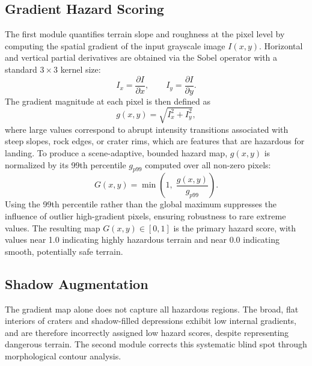 \documentclass{article}
\begin{document}
\subsection{Gradient Hazard Scoring}
The first module quantifies terrain slope and roughness at the pixel level by computing the spatial gradient of the input grayscale image $I(x,y)$. Horizontal and vertical partial derivatives are obtained via the Sobel operator\cite{sobel1968} with a standard $3 \times 3$ kernel size:
\begin{equation}
    I_x = \frac{\partial I}{\partial x}, \qquad I_y = \frac{\partial I}{\partial y}.
\end{equation}
The gradient magnitude at each pixel is then defined as
\begin{equation}
    g(x,y) = \sqrt{I_x^2 + I_y^2},
\end{equation}
where large values correspond to abrupt intensity transitions associated with steep slopes, rock edges, or crater rims, which are features that are hazardous for landing. To produce a scene-adaptive, bounded hazard map, $g(x,y)$ is normalized by its 99th percentile $g_{p99}$ computed over all non-zero pixels:
\begin{equation}
    G(x,y) = \min\!\left(1,\; \frac{g(x,y)}{g_{p99}}\right).
\end{equation}
Using the 99th percentile rather than the global maximum suppresses the influence of outlier high-gradient pixels, ensuring robustness to rare extreme values. The resulting map $G(x,y) \in [0,1]$ is the primary hazard score, with values near 1.0 indicating highly hazardous terrain and near 0.0 indicating smooth, potentially safe terrain.

\subsection{Shadow Augmentation}
The gradient map alone does not capture all hazardous regions. The broad, flat interiors of craters and shadow-filled depressions exhibit low internal gradients, and are therefore incorrectly assigned low hazard scores, despite representing dangerous terrain. The second module corrects this systematic blind spot through morphological contour analysis.
 
\end{document}
